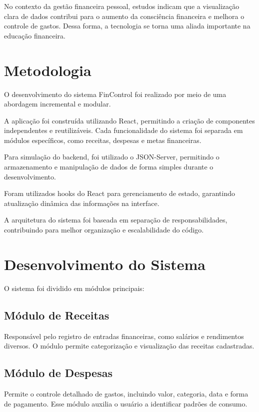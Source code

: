 \documentclass[12pt,oneside,a4paper,chapter=TITLE]{abntex2}
\begin{document}
No contexto da gestão financeira pessoal, estudos indicam que a visualização clara de dados contribui para o aumento da consciência financeira e melhora o controle de gastos. Dessa forma, a tecnologia se torna uma aliada importante na educação financeira.


\chapter{Metodologia}

O desenvolvimento do sistema FinControl foi realizado por meio de uma abordagem incremental e modular.

A aplicação foi construída utilizando React, permitindo a criação de componentes independentes e reutilizáveis. Cada funcionalidade do sistema foi separada em módulos específicos, como receitas, despesas e metas financeiras.

Para simulação do backend, foi utilizado o JSON-Server, permitindo o armazenamento e manipulação de dados de forma simples durante o desenvolvimento.

Foram utilizados hooks do React para gerenciamento de estado, garantindo atualização dinâmica das informações na interface.

A arquitetura do sistema foi baseada em separação de responsabilidades, contribuindo para melhor organização e escalabilidade do código.


\chapter{Desenvolvimento do Sistema}

O sistema foi dividido em módulos principais:

\section{Módulo de Receitas}

Responsável pelo registro de entradas financeiras, como salários e rendimentos diversos. O módulo permite categorização e visualização das receitas cadastradas.

\section{Módulo de Despesas}

Permite o controle detalhado de gastos, incluindo valor, categoria, data e forma de pagamento. Esse módulo auxilia o usuário a identificar padrões de consumo.
\end{document}
